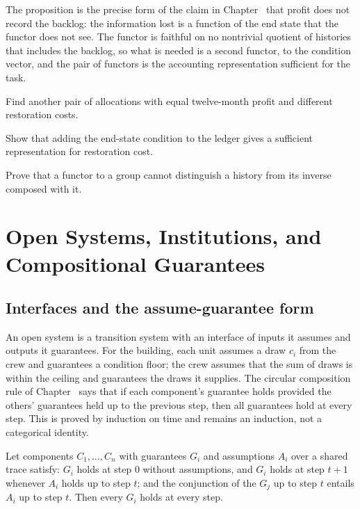 The proposition is the precise form of the claim in Chapter~ that profit does not record the backlog: the information lost is a function of the end state that the functor does not see. The functor is faithful on no nontrivial quotient of histories that includes the backlog, so what is needed is a second functor, to the condition vector, and the pair of functors is the accounting representation sufficient for the task.

\begin{exercise}Find another pair of allocations with equal twelve-month profit and different restoration costs.\end{exercise}
\begin{exercise}Show that adding the end-state condition to the ledger gives a sufficient representation for restoration cost.\end{exercise}
\begin{exercise}Prove that a functor to a group cannot distinguish a history from its inverse composed with it.\end{exercise}

\chapter{Open Systems, Institutions, and Compositional Guarantees}\label{ch:50}

\section{Interfaces and the assume-guarantee form}

An open system is a transition system with an interface of inputs it assumes and outputs it guarantees. For the building, each unit assumes a draw $c_i$ from the crew and guarantees a condition floor; the crew assumes that the sum of draws is within the ceiling and guarantees the draws it supplies. The circular composition rule of Chapter~ says that if each component's guarantee holds provided the others' guarantees held up to the previous step, then all guarantees hold at every step. This is proved by induction on time and remains an induction, not a categorical identity.

\begin{proposition}\label{prop:ag}
Let components $C_1,\dots,C_n$ with guarantees $G_i$ and assumptions $A_i$ over a shared trace satisfy: $G_i$ holds at step $0$ without assumptions, and $G_i$ holds at step $t+1$ whenever $A_i$ holds up to step $t$; and the conjunction of the $G_j$ up to step $t$ entails $A_i$ up to step $t$. Then every $G_i$ holds at every step.
\end{proposition}

